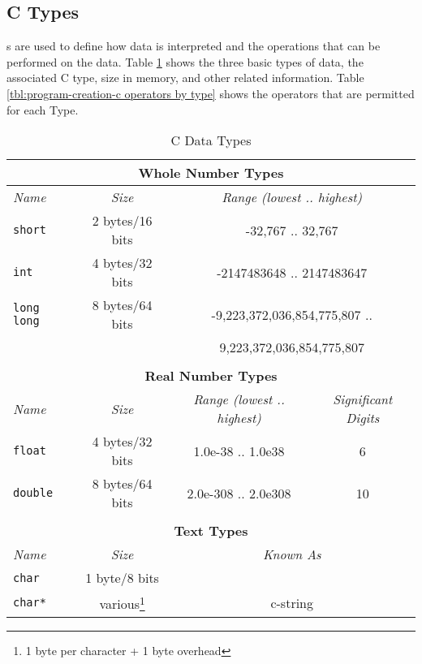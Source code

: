 \clearpage
\subsection{C Types} %
\label{sub:program-creation-c_types}

s are used to define how data is interpreted and the operations that can be performed on the data. Table \ref{tbl:program-creation-c-types} shows the three basic types of data, the associated C type, size in memory, and other related information. Table \ref{tbl:program-creation-c operators by type} shows the operators that are permitted for each Type.

\begin{table}[h] 
\begin{minipage}{\textwidth}
\centering
\begin{tabular}{|l|c|c|c|}
\hline
\multicolumn{4}{|c|}{\textbf{Whole Number Types}} \\
\hline
\emph{Name} & \emph{Size} & \multicolumn{2}{|c|}{\emph{Range (lowest .. highest)}} \\
\hline
\texttt{short} & 2 bytes/16 bits & \multicolumn{2}{|c|}{-32,767 .. 32,767} \\
\texttt{int} & 4 bytes/32 bits & \multicolumn{2}{|c|}{-2147483648 .. 2147483647} \\
\texttt{long long}    & 8 bytes/64 bits & \multicolumn{2}{|c|}{-9,223,372,036,854,775,807 ..} \\
  & & \multicolumn{2}{|c|}{9,223,372,036,854,775,807} \\
\hline
\multicolumn{4}{c}{} \\
\hline
\multicolumn{4}{|c|}{\textbf{Real Number Types}} \\
\hline
\emph{Name} & \emph{Size} & \emph{Range (lowest .. highest)} & \emph{Significant Digits} \\
\hline
\texttt{float} & 4 bytes/32 bits & 1.0e-38 .. 1.0e38 & 6 \\
\texttt{double} & 8 bytes/64 bits & 2.0e-308 .. 2.0e308 & 10 \\
\hline
\multicolumn{4}{c}{} \\
\hline
\multicolumn{4}{|c|}{\textbf{Text Types}} \\
\hline
\emph{Name} & \emph{Size} & \multicolumn{2}{|c|}{\emph{Known As}} \\
\hline
\texttt{char}  & 1 byte/8 bits & \multicolumn{2}{|c|}{} \\
\hline
\texttt{char*} & various\footnote{1 byte per character + 1 byte overhead} &  \multicolumn{2}{|c|}{c-string} \\
\hline
\end{tabular}
\caption{C Data Types}\label{tbl:program-creation-c-types}
\end{minipage}
\end{table}

